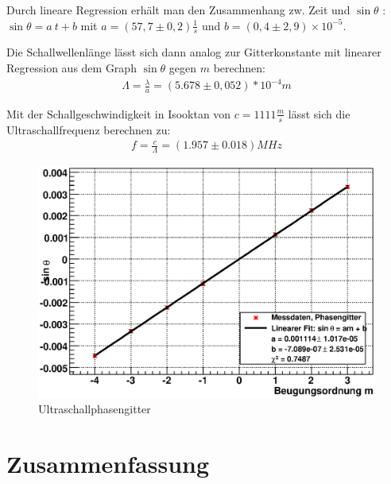 \documentclass[12pt]{article}
\begin{document}
Durch lineare Regression erhält man den Zusammenhang zw. Zeit und $\sin\theta$ : $\sin\theta = a~t + b$ mit $a = (57,7 \pm 0,2) \frac{1}{s}$
und $b = (0,4 \pm 2,9)\times 10^{-5}$.

Die Schallwellenlänge lässt sich dann analog zur Gitterkonstante mit linearer Regression aus dem Graph $\sin\theta$ gegen $m$ berechnen:
\begin{align}
 \Lambda = \frac{\lambda}{a} = (5.678 \pm 0,052)*10^{-4} m
\end{align}

Mit der Schallgeschwindigkeit in Isooktan von $c = 1111 \frac{m}{s}$ lässt sich die Ultraschallfrequenz berechnen zu:
\begin{align}
 f = \frac{c}{\Lambda} = (1.957 \pm 0.018) MHz
\end{align}

\begin{figure}[H]  
\centering
\includegraphics[width=0.9\linewidth]{pictures/phasengitter.eps}
\caption{Ultraschallphasengitter}
\end{figure}

\section{Zusammenfassung}
\end{document}
